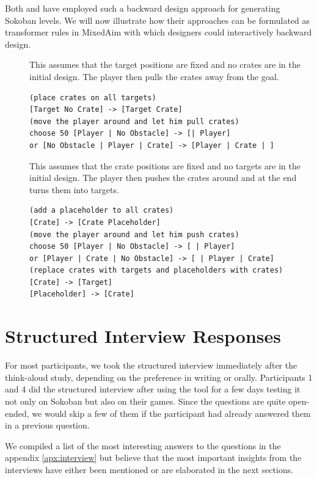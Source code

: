 
Both \cite{Taylor2011} and \cite{Kartal2015} have employed such a backward design approach for generating Sokoban levels. We will now illustrate how their approaches can be formulated as transformer rules in MixedAim with which designers could interactively backward design.

\begin{description}
\item[\cite{Taylor2011}] This assumes that the target positions are fixed and no crates are in the initial design. The player then pulls the crates away from the goal.
\begin{lstlisting}
(place crates on all targets)
[Target No Crate] -> [Target Crate]
(move the player around and let him pull crates)
choose 50 [Player | No Obstacle] -> [| Player]
or [No Obstacle | Player | Crate] -> [Player | Crate | ]    
\end{lstlisting}

\item[\cite{Kartal2015}] This assumes that the crate positions are fixed and no targets are in the initial design. The player then pushes the crates around and at the end turns them into targets.

\begin{lstlisting}
(add a placeholder to all crates)
[Crate] -> [Crate Placeholder]
(move the player around and let him push crates)
choose 50 [Player | No Obstacle] -> [ | Player]
or [Player | Crate | No Obstacle] -> [ | Player | Crate] 
(replace crates with targets and placeholders with crates)
[Crate] -> [Target]
[Placeholder] -> [Crate]
\end{lstlisting}
\end{description}

\section{Structured Interview Responses}

For most participants, we took the structured interview immediately after the think-aloud study, depending on the preference in writing or orally. Participants 1 and 4 did the structured interview after using the tool for a few days testing it not only on Sokoban but also on their games. Since the questions are quite open-ended, we would skip a few of them if the participant had already answered them in a previous question. 

We compiled a list of the most interesting answers to the questions in the appendix \autoref{apx:interview} but believe that the most important insights from the interviews have either been mentioned or are elaborated in the next sections.



